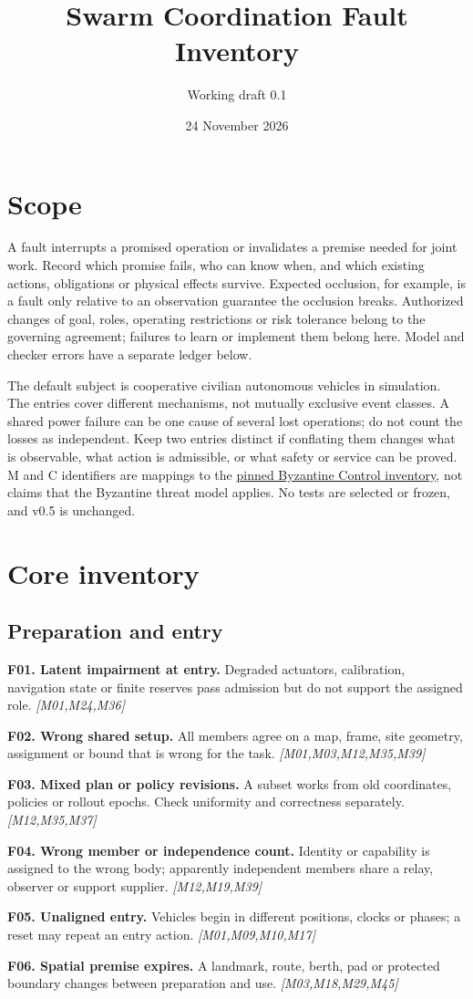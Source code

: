 \documentclass[11pt]{article}
\title{Swarm Coordination Fault Inventory}
\author{Working draft 0.1}
\date{24 November 2026}
\newcommand{\f}[4]{\par\smallskip\noindent\textbf{#1. #2.} #3 \textit{[#4]}\par}
\begin{document}
\maketitle
\section{Scope}
A fault interrupts a promised operation or invalidates a premise needed for joint work. Record which promise fails, who can know when, and which existing actions, obligations or physical effects survive. Expected occlusion, for example, is a fault only relative to an observation guarantee the occlusion breaks. Authorized changes of goal, roles, operating restrictions or risk tolerance belong to the governing agreement; failures to learn or implement them belong here. Model and checker errors have a separate ledger below.

The default subject is cooperative civilian autonomous vehicles in simulation. The entries cover different mechanisms, not mutually exclusive event classes. A shared power failure can be one cause of several lost operations; do not count the losses as independent. Keep two entries distinct if conflating them changes what is observable, what action is admissible, or what safety or service can be proved. M and C identifiers are mappings to the \href{https://github.com/eternal-november/eos-research-programmes/blob/e1348964f73704212d2d8b48d5982a5ed600a2ff/projects/byzantine-control/FAULT-COVERAGE.md}{pinned Byzantine Control inventory}, not claims that the Byzantine threat model applies. No tests are selected or frozen, and v0.5 is unchanged.

\section{Core inventory}
\subsection{Preparation and entry}
\f{F01}{Latent impairment at entry}{Degraded actuators, calibration, navigation state or finite reserves pass admission but do not support the assigned role.}{M01,M24,M36}
\f{F02}{Wrong shared setup}{All members agree on a map, frame, site geometry, assignment or bound that is wrong for the task.}{M01,M03,M12,M35,M39}
\f{F03}{Mixed plan or policy revisions}{A subset works from old coordinates, policies or rollout epochs. Check uniformity and correctness separately.}{M12,M35,M37}
\f{F04}{Wrong member or independence count}{Identity or capability is assigned to the wrong body; apparently independent members share a relay, observer or support supplier.}{M12,M19,M39}
\f{F05}{Unaligned entry}{Vehicles begin in different positions, clocks or phases; a reset may repeat an entry action.}{M01,M09,M10,M17}
\f{F06}{Spatial premise expires}{A landmark, route, berth, pad or protected boundary changes between preparation and use.}{M03,M18,M29,M45}
\end{document}
